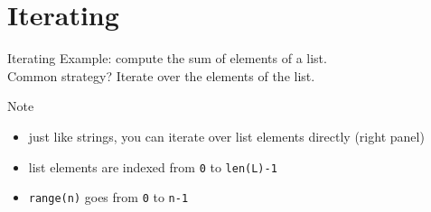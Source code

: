 \documentclass[t,handout,9pt]{beamer}
\begin{document}
\section{Iterating}
\begin{frame}{Iterating}
\vfill
Example: compute the sum of elements of a list.\\
Common strategy? Iterate over the elements of the list.\\
\vfill
{}%
\hfill
{}
\vfill
\begin{block}{Note}
\begin{itemize}
	\item just like strings, you can iterate over list elements directly (right panel)
	\item list elements are indexed from \texttt{0} to \texttt{len(L)-1}
	\item \texttt{range(n)} goes from \texttt{0} to \texttt{n-1}
\end{itemize}
\end{block}
\vfill
\end{frame}
%
\end{document}
